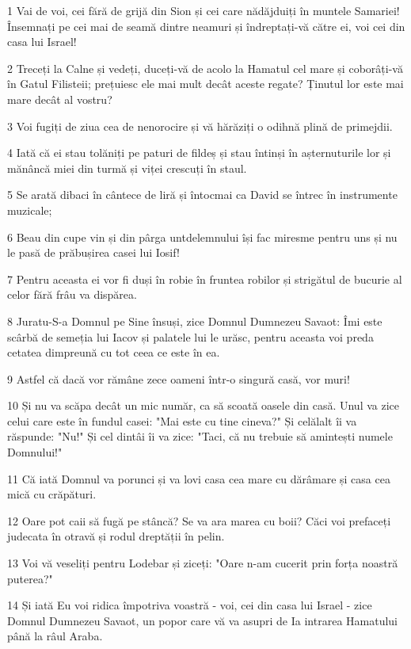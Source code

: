 \par 1 Vai de voi, cei fără de grijă din Sion și cei care nădăjduiți în muntele Samariei! Însemnați pe cei mai de seamă dintre neamuri și îndreptați-vă către ei, voi cei din casa lui Israel!
\par 2 Treceți la Calne și vedeți, duceți-vă de acolo la Hamatul cel mare și coborâți-vă în Gatul Filisteii; prețuiesc ele mai mult decât aceste regate? Ținutul lor este mai mare decât al vostru?
\par 3 Voi fugiți de ziua cea de nenorocire și vă hărăziți o odihnă plină de primejdii.
\par 4 Iată că ei stau tolăniți pe paturi de fildeș și stau întinși în așternuturile lor și mănâncă miei din turmă și viței crescuți în staul.
\par 5 Se arată dibaci în cântece de liră și întocmai ca David se întrec în instrumente muzicale;
\par 6 Beau din cupe vin și din pârga untdelemnului își fac miresme pentru uns și nu le pasă de prăbușirea casei lui Iosif!
\par 7 Pentru aceasta ei vor fi duși în robie în fruntea robilor și strigătul de bucurie al celor fără frâu va dispărea.
\par 8 Juratu-S-a Domnul pe Sine însuși, zice Domnul Dumnezeu Savaot: Îmi este scârbă de semeția lui Iacov și palatele lui le urăsc, pentru aceasta voi preda cetatea dimpreună cu tot ceea ce este în ea.
\par 9 Astfel că dacă vor rămâne zece oameni într-o singură casă, vor muri!
\par 10 Și nu va scăpa decât un mic număr, ca să scoată oasele din casă. Unul va zice celui care este în fundul casei: "Mai este cu tine cineva?" Și celălalt îi va răspunde: "Nu!" Și cel dintâi îi va zice: "Taci, că nu trebuie să amintești numele Domnului!"
\par 11 Că iată Domnul va porunci și va lovi casa cea mare cu dărâmare și casa cea mică cu crăpături.
\par 12 Oare pot caii să fugă pe stâncă? Se va ara marea cu boii? Căci voi prefaceți judecata în otravă și rodul dreptății în pelin.
\par 13 Voi vă veseliți pentru Lodebar și ziceți: "Oare n-am cucerit prin forța noastră puterea?"
\par 14 Și iată Eu voi ridica împotriva voastră - voi, cei din casa lui Israel - zice Domnul Dumnezeu Savaot, un popor care vă va asupri de Ia intrarea Hamatului până la râul Araba.

